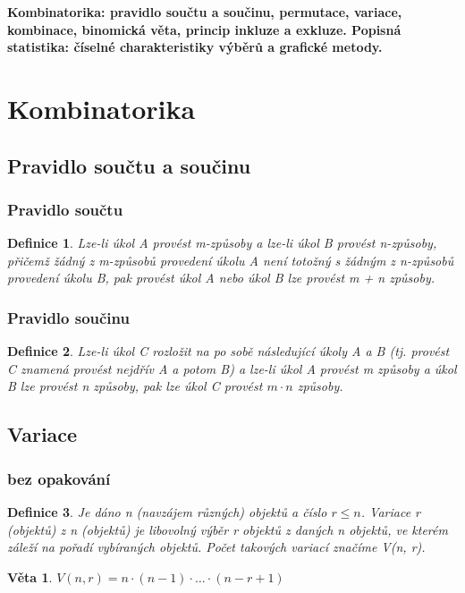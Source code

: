 \documentclass[12pt,a4paper]{article}
\newtheorem{definition}{Definice}
\newtheorem{sentence}{Věta}
\begin{document}
\newpage
\textbf{Kombinatorika: pravidlo součtu a součinu, permutace, variace, kombinace, binomická věta, princip inkluze a
exkluze. Popisná statistika: číselné charakteristiky výběrů a grafické metody.}

\section{Kombinatorika}
\subsection{Pravidlo součtu a součinu}
\subsubsection{Pravidlo součtu}
\begin{definition}
	Lze-li úkol A provést m-způsoby a lze-li úkol B provést n-způsoby,
přičemž žádný z m-způsobů provedení úkolu A není totožný s žádným z n-způsobů
provedení úkolu B, pak provést úkol A nebo úkol B lze provést m + n způsoby.
\end{definition}

\subsubsection{Pravidlo součinu}
\begin{definition}
	Lze-li úkol C rozložit na po sobě následující úkoly A a B (tj. provést
C znamená provést nejdřív A a potom B) a lze-li úkol A provést m způsoby a úkol B lze
provést n způsoby, pak lze úkol C provést $m \cdot n $ způsoby.	
\end{definition}

\subsection{Variace}
\subsubsection{bez opakování}
\begin{definition}
	Je dáno n (navzájem různých) objektů a číslo $r \leq n$. Variace r
(objektů) z n (objektů) je libovolný výběr r objektů z daných n objektů, ve kterém záleží na
pořadí vybíraných objektů. Počet takových variací značíme V(n, r).
\end{definition}
\begin{sentence}
	$V(n, r) = n \cdot (n - 1) \cdot \dots \cdot (n - r + 1)$
\end{sentence}
\end{document}
